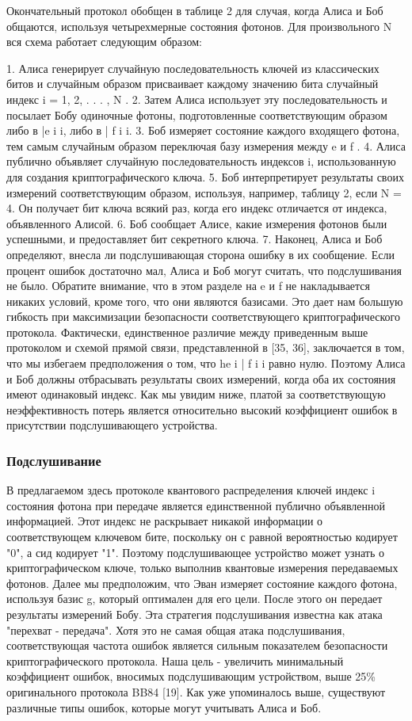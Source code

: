 Окончательный протокол обобщен в таблице 2 для случая, когда Алиса и Боб общаются, используя четырехмерные состояния фотонов. Для произвольного N вся схема работает следующим образом:

1. Алиса генерирует случайную последовательность ключей из классических битов и случайным образом присваивает каждому значению бита случайный индекс i = 1, 2, . . . , N .
2. Затем Алиса использует эту последовательность и посылает Бобу одиночные фотоны, подготовленные соответствующим образом либо в |e i i, либо в | f i i.
3. Боб измеряет состояние каждого входящего фотона, тем самым случайным образом переключая базу измерения между e и f .
4. Алиса публично объявляет случайную последовательность индексов i, использованную для создания криптографического ключа.
5. Боб интерпретирует результаты своих измерений соответствующим образом, используя, например, таблицу 2, если N = 4. Он получает бит ключа всякий раз, когда его индекс отличается от индекса, объявленного Алисой.
6. Боб сообщает Алисе, какие измерения фотонов были успешными, и предоставляет бит секретного ключа.
7. Наконец, Алиса и Боб определяют, внесла ли подслушивающая сторона ошибку в их сообщение. Если процент ошибок достаточно мал, Алиса и Боб могут считать, что подслушивания не было.
Обратите внимание, что в этом разделе на e и f не накладывается никаких условий, кроме того, что они являются базисами. Это дает нам большую гибкость при максимизации безопасности соответствующего криптографического протокола. Фактически, единственное различие между приведенным выше протоколом и схемой прямой связи, представленной в [35, 36], заключается в том, что мы избегаем предположения о том, что he i | f i i равно нулю. Поэтому Алиса и Боб должны отбрасывать результаты своих измерений, когда оба их состояния имеют одинаковый индекс. Как мы увидим ниже, платой за соответствующую неэффективность потерь является относительно высокий коэффициент ошибок в присутствии подслушивающего устройства.


\subsubsection{Подслушивание}

В предлагаемом здесь протоколе квантового распределения ключей индекс i состояния фотона при передаче является единственной публично объявленной информацией. Этот индекс не раскрывает никакой информации о соответствующем ключевом бите, поскольку он с равной вероятностью кодирует "0", а сид кодирует "1". Поэтому подслушивающее устройство может узнать о криптографическом ключе, только выполнив квантовые измерения передаваемых фотонов. Далее мы предположим, что Эван измеряет состояние каждого фотона, используя базис g, который оптимален для его цели. После этого он передает результаты измерений Бобу. Эта стратегия подслушивания известна как атака "перехват - передача". Хотя это не самая общая атака подслушивания, соответствующая частота ошибок является сильным показателем безопасности криптографического протокола. Наша цель - увеличить минимальный коэффициент ошибок, вносимых подслушивающим устройством, выше 25\% оригинального протокола BB84 [19]. Как уже упоминалось выше, существуют различные типы ошибок, которые могут учитывать Алиса и Боб.

